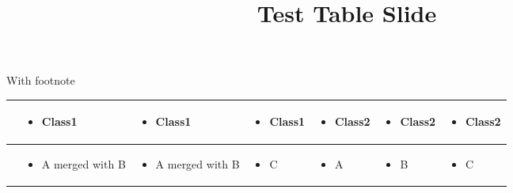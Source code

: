 \documentclass[11pt,a4paper]{article}
\title{Test Table Slide}
\begin{document}
\maketitle

With footnote

\begin{table}[h]
\begin{tabular}{|l|l|l|l|l|l|l|}
\hline
 & \begin{itemize} \item Class1 \end{itemize} & \begin{itemize} \item Class1 \end{itemize} & \begin{itemize} \item Class1 \end{itemize} & \begin{itemize} \item Class2 \end{itemize} & \begin{itemize} \item Class2 \end{itemize} & \begin{itemize} \item Class2 \end{itemize} \\ \hline
 & \begin{itemize} \item A merged with B \end{itemize} & \begin{itemize} \item A merged with B \end{itemize} & \begin{itemize} \item C \end{itemize} & \begin{itemize} \item A \end{itemize} & \begin{itemize} \item B \end{itemize} & \begin{itemize} \item C \end{itemize} \\ \hline

\end{tabular}
\end{table}
\end{document}

